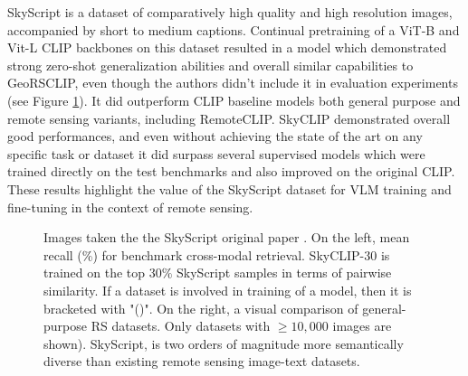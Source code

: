 \documentclass[a4paper, oneside, english]{sapthesis} %
\begin{document}
SkyScript is a dataset of comparatively high quality and high resolution images, accompanied by short to medium captions. Continual pretraining of a ViT-B and Vit-L CLIP backbones on this dataset resulted in a model which demonstrated strong zero-shot generalization abilities and overall similar capabilities to GeoRSCLIP, even though the authors didn't include it in evaluation experiments (see Figure \ref{fig:skyclip}). It did outperform CLIP baseline models both general purpose and remote sensing variants, including RemoteCLIP. SkyCLIP demonstrated overall good performances, and even without achieving the state of the art on any specific task or dataset it did surpass several supervised models which were trained directly on the test benchmarks and also improved on the original CLIP. These results highlight the value of the SkyScript dataset for VLM training and fine-tuning in the context of remote sensing.

\begin{figure}[h]
    \centering
     \quad
\caption{Images taken the the SkyScript original paper \cite{wang2024skyscript}. On the left, mean recall (\%) for benchmark cross-modal retrieval. SkyCLIP-30 is trained on the top $30\%$ SkyScript samples in terms of pairwise similarity. If a dataset is involved in training of a model, then it is bracketed with "()". On the right, a visual comparison of general-purpose RS datasets. Only datasets with $\ge 10,000$ images are shown). SkyScript, is two orders of magnitude more semantically diverse than existing remote sensing image-text datasets.}
\label{fig:skyclip}
\end{figure}
\end{document}
